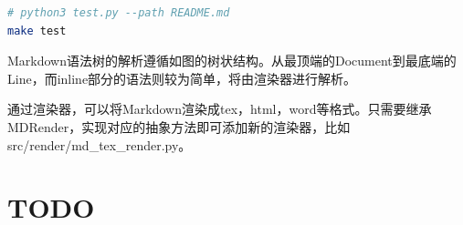 \documentclass[export, 12pt, letterpaper]{ctexrep}
\begin{document}
\begin{lstlisting}[language=Bash]
# python3 test.py --path README.md
make test
\end{lstlisting}

Markdown语法树的解析遵循如图的树状结构。从最顶端的Document到最底端的Line，而inline部分的语法则较为简单，将由渲染器进行解析。

通过渲染器，可以将Markdown渲染成tex，html，word等格式。只需要继承MDRender，实现对应的抽象方法即可添加新的渲染器，比如src/render/md\_tex\_render.py。




\chapter{TODO}
\end{document}
